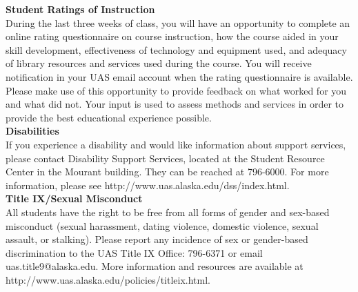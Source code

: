 \documentclass[11pt,letterpaper]{article}
\begin{document}
\textbf{Student Ratings of Instruction}\\
During the last three weeks of class, you will have an opportunity to complete an online rating questionnaire on course instruction, how the course aided in your skill development,  effectiveness of technology and equipment used, and adequacy of library resources and services used during the course. You will receive notification in your UAS email account when the rating questionnaire is available. Please make use of this opportunity to provide feedback on what worked for you and what did not. Your input is used to assess methods and services in order to provide the best educational experience possible.\\

\textbf{Disabilities}\\
If you experience a disability and would like information about support services, please contact Disability Support Services, located at the Student Resource Center in the Mourant building.  They can be reached at 796-6000. For more information, please see http://www.uas.alaska.edu/dss/index.html.\\

\textbf{Title IX/Sexual Misconduct}\\
All students have the right to be free from all forms of gender and sex-based misconduct (sexual harassment, dating violence, domestic violence, sexual assault, or stalking). Please report any incidence of sex or gender-based discrimination to the UAS Title IX Office: 796-6371 or email {uas.title9@alaska.edu}. More information and resources are available at\\ http://www.uas.alaska.edu/policies/titleix.html.

\clearpage
\end{document}

